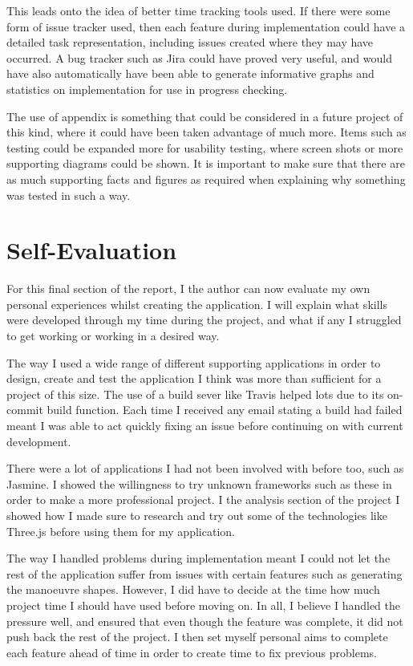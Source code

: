 This leads onto the idea of better time tracking tools used. If there were some form of issue tracker used, then each feature during implementation could have a detailed task representation, including issues created where they may have occurred. A bug tracker such as Jira could have proved very useful, and would have also automatically have been able to generate informative graphs and statistics on implementation for use in progress checking.

The use of appendix is something that could be considered in a future project of this kind, where it could have been taken advantage of much more. Items such as testing could be expanded more for usability testing, where screen shots or more supporting diagrams could be shown. It is important to make sure that there are as much supporting facts and figures as required when explaining why something was tested in such a way.

\section{Self-Evaluation}
For this final section of the report, I the author can now evaluate my own personal experiences whilst creating the application. I will explain what skills were developed through my time during the project, and what if any I struggled to get working or working in a desired way.

The way I used a wide range of different supporting applications in order to design, create and test the application I think was more than sufficient for a project of this size. The use of a build sever like Travis helped lots due to its on-commit build function. Each time I received any email stating a build had failed meant I was able to act quickly fixing an issue before continuing on with current development.

There were a lot of applications I had not been involved with before too, such as Jasmine. I showed the willingness to try unknown frameworks such as these in order to make a more professional project. I the analysis section of the project I showed how I made sure to research and try out some of the technologies like Three.js before using them for my application.

The way I handled problems during implementation meant I could not let the rest of the application suffer from issues with certain features such as generating the manoeuvre shapes. However, I did have to decide at the time how much project time I should have used before moving on. In all, I believe I handled the pressure well, and ensured that even though the feature was complete, it did not push back the rest of the project. I then set myself personal aims to complete each feature ahead of time in order to create time to fix previous problems.

